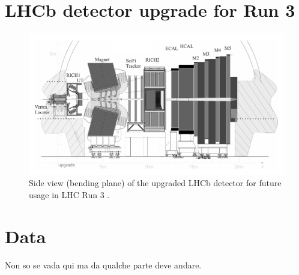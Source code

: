 \section{LHCb detector upgrade for Run 3}

\begin{figure}[t]
	\centering
	\includegraphics[width=\textwidth]{graphics/02-lhcb/lhcb_diagram_run3.png}
	\caption[LHCb detector side view.]{Side view (bending plane) of the upgraded LHCb detector for future usage in LHC Run 3 \cite{Piucci_2017}.}
	\label{fig:2:lhcb_diagram_run3}
\end{figure}

\section{Data}
Non so se vada qui ma da qualche parte deve andare.